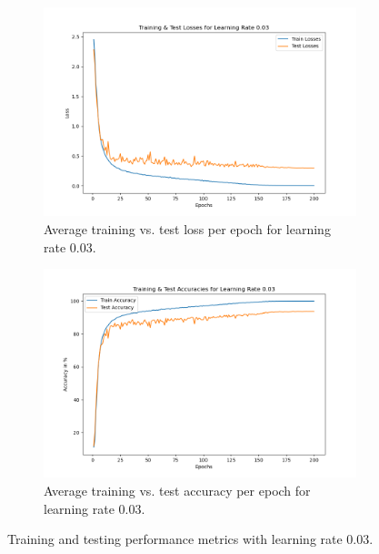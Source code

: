 \begin{figure}[H]
    \centering
    \begin{subfigure}[t]{0.48\textwidth}
        \centering
        \includegraphics[width=\textwidth]{assignment_1/report/images/losses_003.png}
        \caption{Average training vs. test loss per epoch for learning rate 0.03.}
    \end{subfigure}
    \hfill
    \begin{subfigure}[t]{0.48\textwidth}
        \centering
        \includegraphics[width=\textwidth]{assignment_1/report/images/accuracies_003.png}
        \caption{Average training vs. test accuracy per epoch for learning rate 0.03.}
    \end{subfigure}
    \caption{Training and testing performance metrics with learning rate 0.03.}
\end{figure}

